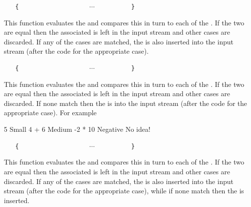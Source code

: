 \documentclass[oneside]{book}
\begin{document}
\begin{function}{\IntCaseT}
\begin{syntax}
 
~ ~ \verb|{|
~ ~ ~ ~  
~ ~ ~ ~  
~ ~ ~ ~ $\cdots$
~ ~ ~ ~  
~ ~ \verb|}|
~ ~ 
\end{syntax}
This function evaluates the  and
compares this in turn to each of the
. If the two are equal then the
associated  is left in the input stream
and other cases are discarded. If any of the
cases are matched, the  is also inserted into the
input stream (after the code for the appropriate case).
\end{function}

\begin{function}{\IntCaseF}
\begin{syntax}
 
~ ~ \verb|{|
~ ~ ~ ~  
~ ~ ~ ~  
~ ~ ~ ~ $\cdots$
~ ~ ~ ~  
~ ~ \verb|}|
~ ~ 
\end{syntax}
This function evaluates the  and
compares this in turn to each of the
. If the two are equal then the
associated  is left in the input stream
and other cases are discarded. If none
match then the  is into the input stream
(after the code for the appropriate case).
For example
\begin{demohigh}
\IgnoreSpacesOn
{}
  {
    { 5 }       { Small }
    { 4 + 6 }   { Medium }
    { -2 * 10 } { Negative }
  }
  { No idea! }
\IgnoreSpacesOff
\end{demohigh}
\end{function}

\begin{function}{\IntCaseTF}
\begin{syntax}
 
~ ~ \verb|{|
~ ~ ~ ~  
~ ~ ~ ~  
~ ~ ~ ~ $\cdots$
~ ~ ~ ~  
~ ~ \verb|}|
~ ~ 
~ ~ 
\end{syntax}
This function evaluates the  and
compares this in turn to each of the
. If the two are equal then the
associated  is left in the input stream
and other cases are discarded. If any of the
cases are matched, the  is also inserted into the
input stream (after the code for the appropriate case), while if none
match then the  is inserted.
\end{function}
\end{document}
